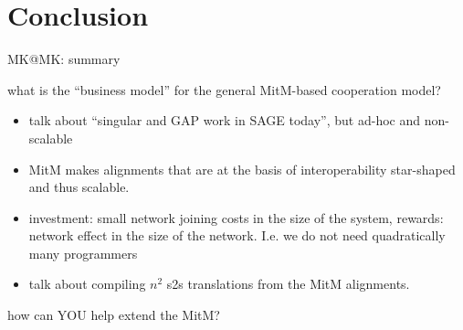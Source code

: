 \section{Conclusion}\label{sec:concl}
\begin{todolist}{MK@MK: summary}
\item what is the ``business model'' for the general MitM-based cooperation model?
  \begin{itemize}
  \item talk about ``singular and GAP work in SAGE today'', but ad-hoc and non-scalable 
  \item MitM makes alignments that are at the basis of interoperability star-shaped and
    thus scalable.
  \item investment: small network joining costs in the size of the system, rewards:
    network effect in the size of the network. I.e. we do not need quadratically many
    programmers
  \item talk about compiling $n^2$ s2s translations from the MitM alignments. 
  \end{itemize}
\item how can YOU help extend the MitM?
\end{todolist}


